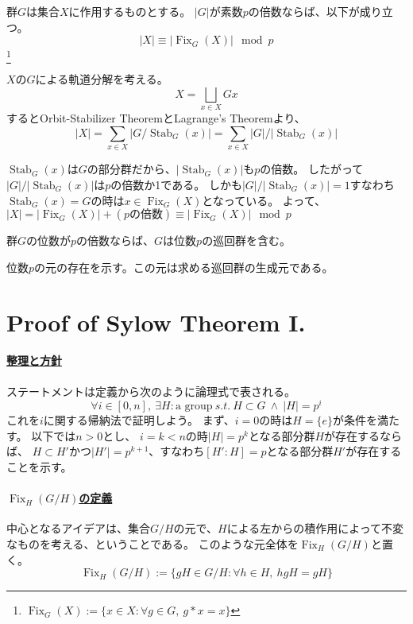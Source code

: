 \documentclass[a4paper]{jarticle}
\newcommand{\Stab}{\operatorname{Stab}}
\newcommand{\Fix}{\operatorname{Fix}}
\newcommand{\ulpar}[1]{\paragraph{\underline{#1}}}
\begin{document}
    \begin{Lemma}
        群$G$は集合$X$に作用するものとする。
        $|G|$が素数$p$の倍数ならば、以下が成り立つ。
        \[ |X| \equiv |\Fix_G(X)| \mod p\]
        \footnote{$\Fix_G(X):=\{x \in X : \forall g \in G,~ g \ast x=x \}$}
    \end{Lemma}
    \begin{Proof}
        $X$の$G$による軌道分解を考える。
        \[ X= \bigsqcup_{x \in X}{Gx} \]
        するとOrbit-Stabilizer TheoremとLagrange's Theoremより、
        \[ |X| = \sum_{x \in X}{|G/ \Stab_G(x)|} = \sum_{x \in X}{|G|/|\Stab_G(x)|}\]

        $\Stab_G(x)$は$G$の部分群だから、$|\Stab_G(x)|$も$p$の倍数。
        したがって$|G|/|\Stab_G(x)|$は$p$の倍数か1である。
        しかも$|G|/|\Stab_G(x)|=1$すなわち$\Stab_G(x)=G$の時は$x \in \Fix_G(X)$となっている。
        よって、$|X|=|\Fix_G(X)|+(p\mbox{の倍数}) \equiv |\Fix_G(X)| \mod p$
        \QED
    \end{Proof}

    \begin{Them}
        群$G$の位数が$p$の倍数ならば、$G$は位数$p$の巡回群を含む。
    \end{Them}
    \begin{Proof}
        位数$p$の元の存在を示す。この元は求める巡回群の生成元である。
    \end{Proof}

\section{Proof of Sylow Theorem I.}
    \ulpar{整理と方針}
    ステートメントは定義から次のように論理式で表される。
    \[ \forall i \in [0, n],~ \exists H : \mbox{a group} ~s.t.~ H \subset G ~\wedge~ |H|=p^i \]
    これを$i$に関する帰納法で証明しよう。
    まず、$i=0$の時は$H=\{e\}$が条件を満たす。
    以下では$n > 0$とし、
    $i=k<n$の時$|H|=p^k$となる部分群$H$が存在するならば、
    $H \subset H'$かつ$|H'|=p^{k+1}$、すなわち$[H':H]=p$となる部分群$H'$が存在することを示す。

    \ulpar{$\Fix_{H}(G/H)$の定義}
    中心となるアイデアは、集合$G/H$の元で、$H$による左からの積作用によって不変なものを考える、ということである。
    このような元全体を$\Fix_{H}(G/H)$と置く。
    \[
        \Fix_{H}(G/H) := \{ gH \in G/H : \forall h \in H,~ hgH=gH \}
    \]
\end{document}
